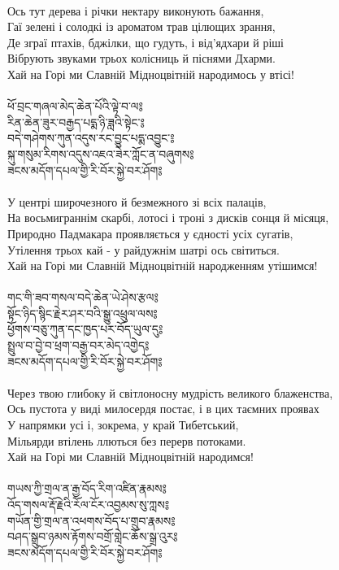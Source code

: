 \\
Ось тут дерева і річки нектару виконують бажання, \\
Гаї зелені і солодкі із ароматом трав цілющих зрання,\\
Де зграї птахів, бджілки, що гудуть, і від'ядхари й ріші\\
Вібрують звуками трьох колісниць й піснями Дхарми.\\
Хай на Горі ми Славній Мідноцвітній народимось у втісі! \\
\\
{\ti ཕོ་བྲང་གཞལ་མེད་ཆེན་པོའི་ལྟེ་བ་ལ༔\\
རིན་ཆེན་ཟུར་བརྒྱད་པདྨ་ཉི་ཟླའི་སྟེང་༔\\
བདེ་གཤེགས་ཀུན་འདུས་རང་བྱུང་པདྨ་འབྱུང་༔\\
སྐུ་གསུམ་རིགས་འདུས་འཇའ་ཟེར་ཀློང་ན་བཞུགས༔\\
ཟངས་མདོག་དཔལ་གྱི་རི་བོར་སྐྱེ་བར་ཤོག༔}\\
\\
У центрі широчезного й безмежного зі всіх палаців,\\
На восьмиграннім скарбі, лотосі і троні з дисків сонця й місяця,\\
Природно Падмакара проявляється у єдності усіх сугатів,\\
Утілення трьох кай - у райдужнім шатрі ось світиться.\\
Хай на Горі ми Славній Мідноцвітній народженням утішимся! \\
\\
{\ti གང་གི་ཟབ་གསལ་བདེ་ཆེན་ཡེ་ཤེས་རྩལ༔\\
སྟོང་ཉིད་སྙིང་རྗེར་ཤར་བའི་སྒྱུ་འཕྲུལ་ལས༔\\
ཕྱོགས་བཅུ་ཀུན་དང་ཁྱད་པར་བོད་ཡུལ་དུ༔\\
སྤྲུལ་བ་བྱེ་བ་ཕྲག་བརྒྱ་བར་མེད་འགྱེད༔\\
ཟངས་མདོག་དཔལ་གྱི་རི་བོར་སྐྱེ་བར་ཤོག༔}\\
\\
\ru
Через твою глибоку й світлоносну мудрість великого блаженства,\\
Ось пустота у виді милосердя постає, і в цих таємних проявах\\
У напрямки усі і, зокрема, у край Тибетський,\\
Мільярди втілень ллються без перерв потоками. \\
Хай на Горі ми Славній Мідноцвітній народимся!\\
\\
{\ti གཡས་ཀྱི་གྲལ་ན་རྒྱ་བོད་རིག་འཛིན་རྣམས༔\\
འོད་གསལ་རྡོ་རྗེའི་རོལ་ངོར་འབྱམས་སུ་ཀླས༔\\
གཡོན་གྱི་གྲལ་ན་འཕགས་བོད་པ་གྲུབ་རྣམས༔\\
བཤད་སྒྲུབ་ཉམས་རྟོགས་བགྲོ་གླེང་ཆོས་སྒྲ་འུར༔\\
ཟངས་མདོག་དཔལ་གྱི་རི་བོར་སྐྱེ་བར་ཤོག༔}\\
